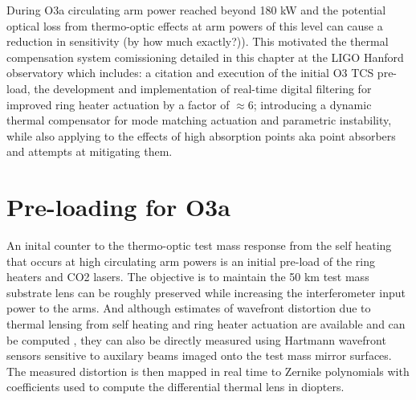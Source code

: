 




During O3a circulating arm power reached beyond 180 kW and the potential optical loss from thermo-optic effects at arm powers of this level can cause a reduction in sensitivity (by how much exactly?)). This motivated the thermal compensation system comissioning detailed in this chapter at the LIGO Hanford observatory which includes: a citation and execution of the initial O3 TCS pre-load, the development and implementation of real-time digital filtering for improved ring heater actuation by a factor of $\approx 6$; introducing a dynamic thermal compensator for mode matching actuation and parametric instability, while also applying to the effects of high absorption points aka point absorbers and attempts at mitigating them. 

\section{Pre-loading for O3a}
An inital counter to the thermo-optic test mass response from the self heating that occurs at high circulating arm powers is an initial pre-load of the ring heaters and CO2 lasers. The objective is to maintain the 50 km test mass substrate lens can be roughly preserved while increasing the interferometer input power to the arms. And although estimates of wavefront distortion due to thermal lensing from self heating and ring heater actuation are available and can be computed \cite{Ramette:16, hello_vinet}, they can also be directly measured using Hartmann wavefront sensors sensitive to auxilary beams imaged onto the test mass mirror surfaces. The measured distortion is then mapped in real time to Zernike polynomials with coefficients used to compute the differential thermal lens in diopters.

